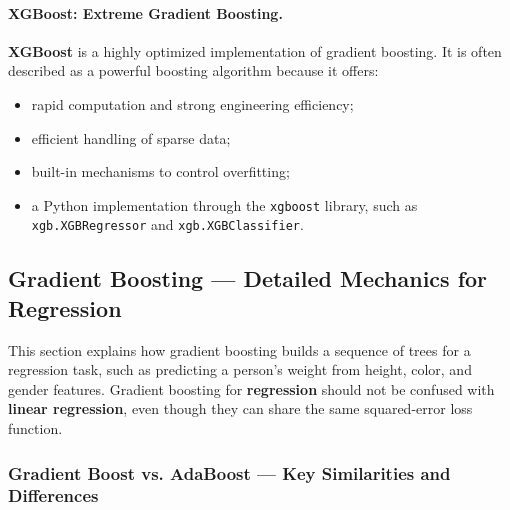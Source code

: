 \documentclass[12pt,openany]{book}
\begin{document}
\paragraph{XGBoost: Extreme Gradient Boosting.}
\textbf{XGBoost} is a highly optimized implementation of gradient boosting. It is often described as a powerful boosting algorithm because it offers:

\begin{itemize}[leftmargin=*]
    \item rapid computation and strong engineering efficiency;
    \item efficient handling of sparse data;
    \item built-in mechanisms to control overfitting;
    \item a Python implementation through the \texttt{xgboost} library, such as \texttt{xgb.XGBRegressor} and \texttt{xgb.XGBClassifier}.
\end{itemize}

\subsection{Gradient Boosting --- Detailed Mechanics for Regression}

This section explains how gradient boosting builds a sequence of trees for a regression task, such as predicting a person's weight from height, color, and gender features. Gradient boosting for \textbf{regression} should not be confused with \textbf{linear regression}, even though they can share the same squared-error loss function.

\subsubsection{Gradient Boost vs. AdaBoost --- Key Similarities and Differences}
\end{document}
